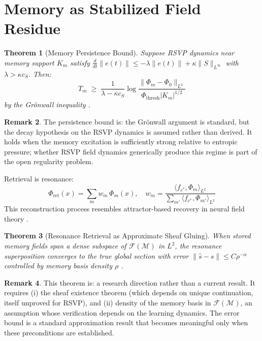 \documentclass[12pt, a4paper]{article}
\theoremstyle{rsvpstyle}
\newtheorem{theorem}{Theorem}[section]
\theoremstyle{definition}
\newtheorem{remark}[theorem]{Remark}
\newcommand{\OpMan}{\mathcal{M}}
\begin{document}
\section{Memory as Stabilized Field Residue}

\begin{theorem}[Memory Persistence Bound]
\label{thm:persist}
Suppose RSVP dynamics near memory support $K_m$ satisfy $\frac{d}{dt}\|e(t)\| \leq -\lambda\|e(t)\| + \kappa\|S\|_{L^\infty}$ with $\lambda > \kappa c_S$. Then:
\begin{equation}
  T_m \;\geq\; \frac{1}{\lambda - \kappa c_S}\log\frac{\|\Phi_m - \Phi_0\|_{L^2}}
  {\Phi_\mathrm{thresh}|K_m|^{1/2}}
\end{equation}
by the Grönwall inequality \citep{Arnold1989}.
\end{theorem}

\begin{remark}
The persistence bound is: the Grönwall argument is standard, but
the decay hypothesis on the RSVP dynamics is assumed rather than derived. It
holds when the memory excitation is sufficiently strong relative to entropic
pressure; whether RSVP field dynamics generically produce this regime is part
of the open regularity problem.
\end{remark}

Retrieval is resonance:
\begin{equation}
  \Phi_\mathrm{ret}(x) = \sum_m w_m\,\Phi_m(x),\quad
  w_m = \frac{\langle f_{c^*}, \Phi_m\rangle_{L^2}}{\sum_{m'}\langle f_{c^*},\Phi_{m'}\rangle_{L^2}}
\end{equation}
This reconstruction process resembles attractor-based recovery in neural
field theory \citep{WilsonCowan1972}.

\begin{theorem}[Resonance Retrieval as Approximate Sheaf Gluing]
\label{thm:resonance}
When stored memory fields span a dense subspace of $\mathcal{F}(\OpMan)$ in
$L^2$, the resonance superposition converges to the true global section with
error $\|\hat{s}-s\| \leq C\rho^{-\alpha}$ controlled by memory basis density
$\rho$ \citep{Rudin1991}.
\end{theorem}

\begin{remark}
This theorem is: a research direction rather than a current result. It
requires (i) the sheaf existence theorem (which depends on unique continuation,
itself unproved for RSVP), and (ii) density of the memory basis in
$\mathcal{F}(\OpMan)$, an assumption whose verification depends on the learning
dynamics. The error bound is a standard approximation result that becomes
meaningful only when these preconditions are established.
\end{remark}
\end{document}
